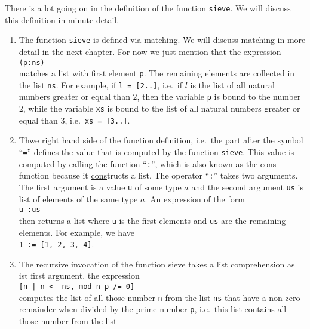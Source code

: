 \documentclass[11pt]{report}
\newcommand{\blue}[1]{{\color{blue}#1}}
\begin{document}
\begin{enumerate}[(a)]
  There is a lot going on in the definition of the function \texttt{sieve}.  We will discuss this definition
  in minute detail.
  \begin{enumerate}[1.]
  \item The function \texttt{sieve} is defined via \blue{matching}.  We will discuss matching in more detail in
    the next chapter.  For now we just mention that the expression
    \\[0.2cm]
    \hspace*{1.3cm}
    \texttt{(p:ns)}
    \\[0.2cm]
    matches a list with first element \texttt{p}.  The remaining elements are collected in the list
    \texttt{ns}.  For example, if \texttt{l = [2..]}, i.e.~if $l$ is the list of all natural numbers greater or
    equal than $2$, then the variable \texttt{p} is bound to the number $2$, while the variable \texttt{xs} is
    bound to the list of all natural numbers greater or equal than $3$, i.e.~\texttt{xs = [3..]}.
  \item Thwe right hand side of the function definition, i.e.~the part after the symbol ``\texttt{=}'' defines the
    value that is computed by the function \texttt{sieve}.  This value is computed by calling the function
    ``\texttt{:}'', which is also known as the \blue{cons} function because it \underline{cons}tructs a list.
    The operator ``\texttt{:}'' takes two arguments.  The first argument is a value \texttt{u} of some type $a$
    and the second argument \texttt{us} is list of elements of the same type $a$.  An expression of the form
    \\[0.2cm]
    \hspace*{1.3cm}
    \texttt{u :\;us}
    \\[0.2cm]
    then returns a list where \texttt{u} is the first elements and \texttt{us} are the remaining elements.
    For example, we have
    \\[0.2cm]
    \hspace*{1.3cm}
    \texttt{1 :\;[2, 3, 4] = [1, 2, 3, 4]}.
  \item The recursive invocation of the function sieve takes a \blue{list comprehension} as ist first argument.
    the expression
    \\[0.2cm]
    \hspace*{1.3cm}
    \texttt{[n | n <- ns, mod n p /= 0]}
    \\[0.2cm]
    computes the list of all those number \texttt{n} from the list \texttt{ns} that have a non-zero remainder
    when divided by the prime number \texttt{p}, i.e.~this list contains all those number from the list

\end{enumerate}
\end{enumerate}
\end{document}
